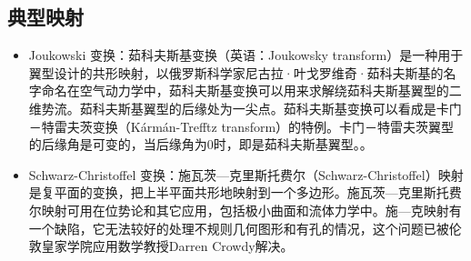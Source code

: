 \documentclass[12pt]{article}
\begin{document}
	\subsection{典型映射}
	\begin{itemize}
		\item Joukowski 变换：茹科夫斯基变换（英语：Joukowsky transform）是一种用于翼型设计的共形映射，以俄罗斯科学家尼古拉·叶戈罗维奇·茹科夫斯基的名字命名在空气动力学中，茹科夫斯基变换可以用来求解绕茹科夫斯基翼型的二维势流。茹科夫斯基翼型的后缘处为一尖点。茹科夫斯基变换可以看成是卡门－特雷夫茨变换（Kármán-Trefftz transform）的特例。卡门－特雷夫茨翼型的后缘角是可变的，当后缘角为0时，即是茹科夫斯基翼型。。
		\item Schwarz-Christoffel 变换：施瓦茨—克里斯托费尔（Schwarz-Christoffel）映射是复平面的变换，把上半平面共形地映射到一个多边形。施瓦茨—克里斯托费尔映射可用在位势论和其它应用，包括极小曲面和流体力学中。施—克映射有一个缺陷，它无法较好的处理不规则几何图形和有孔的情况，这个问题已被伦敦皇家学院应用数学教授Darren Crowdy解决。
	\end{itemize}
	
	
\end{document}
